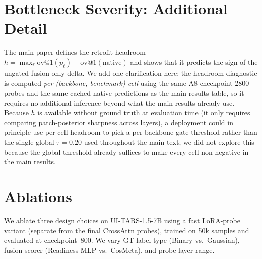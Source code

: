 \section{Bottleneck Severity: Additional Detail}
\label{app:severity}

The main paper defines the retrofit headroom $h=\max_\ell\text{ov@1}(p_\ell)-\text{ov@1}(\text{native})$ and shows that it predicts the sign of the ungated fusion-only delta. We add one clarification here: the headroom diagnostic is computed \emph{per (backbone, benchmark) cell} using the same A8 checkpoint-2800 probes and the same cached native predictions as the main results table, so it requires no additional inference beyond what the main results already use. Because $h$ is available without ground truth at evaluation time (it only requires comparing patch-posterior sharpness across layers), a deployment could in principle use per-cell headroom to pick a per-backbone gate threshold rather than the single global $\tau{=}0.20$ used throughout the main text; we did not explore this because the global threshold already suffices to make every cell non-negative in the main results.

\section{Ablations}
\label{app:ablation}

We ablate three design choices on UI-TARS-1.5-7B using a fast LoRA-probe variant (separate from the final CrossAttn probes), trained on 50k samples and evaluated at checkpoint~800. We vary GT label type (Binary vs.\ Gaussian), fusion scorer (Readiness-MLP vs.\ CosMeta), and probe layer range.

